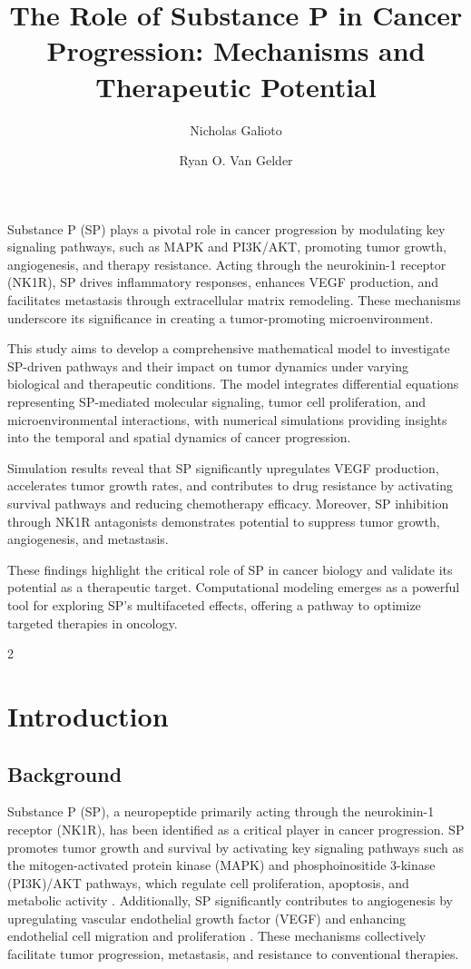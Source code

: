 \documentclass{article}
\title{The Role of Substance P in Cancer Progression: Mechanisms and Therapeutic Potential}
\author{Nicholas Galioto}
\author{Ryan O. Van Gelder}
\affil{Citizen Gardens - The Foundation of Multiplicity, info@citizengardens.org}
\date{}
\theoremstyle{plain}
\theoremstyle{definition}
\begin{document}
\maketitle

Substance P (SP) plays a pivotal role in cancer progression by modulating key signaling pathways, such as MAPK and PI3K/AKT, promoting tumor growth, angiogenesis, and therapy resistance. Acting through the neurokinin-1 receptor (NK1R), SP drives inflammatory responses, enhances VEGF production, and facilitates metastasis through extracellular matrix remodeling. These mechanisms underscore its significance in creating a tumor-promoting microenvironment.

This study aims to develop a comprehensive mathematical model to investigate SP-driven pathways and their impact on tumor dynamics under varying biological and therapeutic conditions. The model integrates differential equations representing SP-mediated molecular signaling, tumor cell proliferation, and microenvironmental interactions, with numerical simulations providing insights into the temporal and spatial dynamics of cancer progression.

Simulation results reveal that SP significantly upregulates VEGF production, accelerates tumor growth rates, and contributes to drug resistance by activating survival pathways and reducing chemotherapy efficacy. Moreover, SP inhibition through NK1R antagonists demonstrates potential to suppress tumor growth, angiogenesis, and metastasis.

These findings highlight the critical role of SP in cancer biology and validate its potential as a therapeutic target. Computational modeling emerges as a powerful tool for exploring SP's multifaceted effects, offering a pathway to optimize targeted therapies in oncology.

\newpage
\begin{multicols}{2}
\begin{singlespace}
\tableofcontents
\end{singlespace}
\end{multicols}

\section{Introduction}

\subsection{Background}
Substance P (SP), a neuropeptide primarily acting through the neurokinin-1 receptor (NK1R), has been identified as a critical player in cancer progression. SP promotes tumor growth and survival by activating key signaling pathways such as the mitogen-activated protein kinase (MAPK) and phosphoinositide 3-kinase (PI3K)/AKT pathways, which regulate cell proliferation, apoptosis, and metabolic activity \cite{harrison2019substanceP}. Additionally, SP significantly contributes to angiogenesis by upregulating vascular endothelial growth factor (VEGF) and enhancing endothelial cell migration and proliferation \cite{williams2020angiogenesis}. These mechanisms collectively facilitate tumor progression, metastasis, and resistance to conventional therapies.
\end{document}

